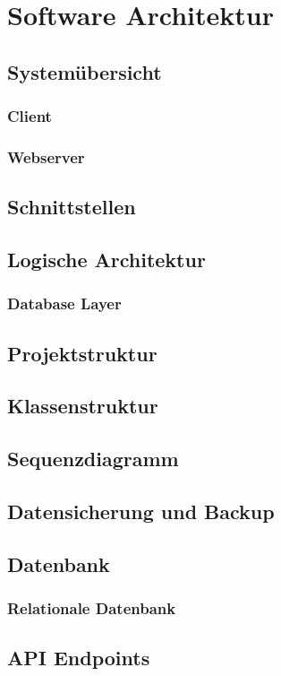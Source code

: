 \section{Software Architektur}

\subsection{Systemübersicht}


\subsubsection*{Client}


\subsubsection*{Webserver}



\subsection{Schnittstellen}

\newpage



\subsection{Logische Architektur}


\subsubsection*{Database Layer}

\newpage

\subsection{Projektstruktur}



\subsection{Klassenstruktur}


\newpage

\subsection{Sequenzdiagramm}




\subsection{Datensicherung und Backup}


\newpage

\subsection{Datenbank}

\subsubsection*{Relationale Datenbank}

\newpage

\subsection{API Endpoints}

\newpage
